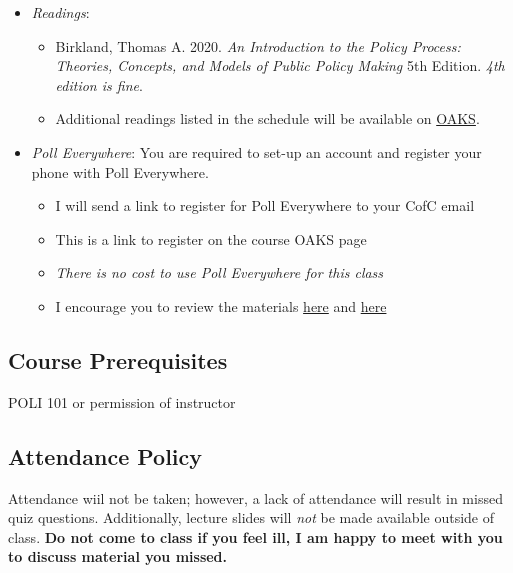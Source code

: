 \begin{itemize}

\item
  \emph{Readings}:

  \begin{itemize}
  
  \item
    Birkland, Thomas A. 2020. \emph{An Introduction to the Policy
    Process: Theories, Concepts, and Models of Public Policy Making} 5th
    Edition. \emph{4th edition is fine}.
  \item
    Additional readings listed in the schedule will be available on
    \href{https://lms.cofc.edu/d2l/login}{OAKS}.
  \end{itemize}
\item
  \emph{Poll Everywhere}: You are required to set-up an account and
  register your phone with Poll Everywhere.

  \begin{itemize}
  
  \item
    I will send a link to register for Poll Everywhere to your CofC
    email
  \item
    This is a link to register on the course OAKS page
  \item
    \emph{There is no cost to use Poll Everywhere for this class}
  \item
    I encourage you to review the materials
    \href{https://www.polleverywhere.com/guides/student}{here} and
    \href{https://blog.polleverywhere.com/students-poll-everywhere-101/}{here}
  \end{itemize}
\end{itemize}

\hypertarget{course-prerequisites}{%
\subsection{Course Prerequisites}\label{course-prerequisites}}

POLI 101 or permission of instructor

\hypertarget{attendance-policy}{%
\subsection{Attendance Policy}\label{attendance-policy}}

Attendance wiil not be taken; however, a lack of attendance will result
in missed quiz questions. Additionally, lecture slides will \emph{not}
be made available outside of class. \textbf{Do not come to class if you
feel ill, I am happy to meet with you to discuss material you missed.}

